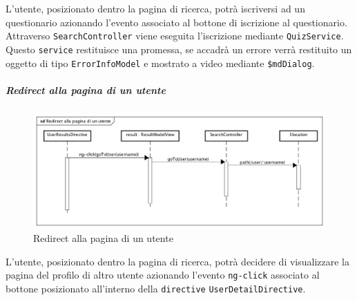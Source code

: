 L'utente, posizionato dentro la pagina di ricerca, potrà iscriversi ad un questionario azionando l'evento associato al bottone di iscrizione al questionario. Attraverso \texttt{SearchController} viene eseguita l'iscrizione mediante \texttt{QuizService}. Questo \texttt{service} restituisce una promessa, se accadrà un errore verrà restituito un oggetto di tipo \texttt{ErrorInfoModel} e mostrato a video mediante \texttt{\$mdDialog}.


\subparagraph{Redirect alla pagina di un utente}

\label{Redirect alla pagina di un utente}

\begin{figure}[ht]
	\centering
	\includegraphics[scale=0.5,keepaspectratio]{UML/DiagrammiDiSequenza/Front-end/Search_goToUser.png}
	\caption{Redirect alla pagina di un utente}
\end{figure} \FloatBarrier

L'utente, posizionato dentro la pagina di ricerca, potrà decidere di visualizzare la pagina del profilo di altro utente azionando l'evento \texttt{ng-click} associato al bottone posizionato all'interno della \texttt{directive} \texttt{UserDetailDirective}.